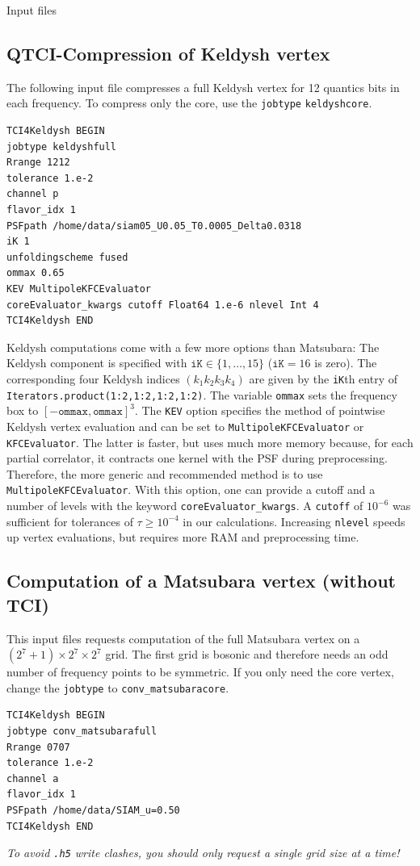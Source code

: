 \documentclass[12pt]{article}
\begin{document}
\begin{section}{Input files}
\subsection{QTCI-Compression of Keldysh vertex}
\label{subsec:KeldyshCompression}
The following input file compresses a full Keldysh vertex for 12 quantics bits in each frequency.
To compress only the core, use the \texttt{jobtype} \texttt{keldyshcore}.
\begin{verbatim}
TCI4Keldysh BEGIN
jobtype keldyshfull
Rrange 1212
tolerance 1.e-2
channel p
flavor_idx 1
PSFpath /home/data/siam05_U0.05_T0.0005_Delta0.0318
iK 1
unfoldingscheme fused
ommax 0.65
KEV MultipoleKFCEvaluator
coreEvaluator_kwargs cutoff Float64 1.e-6 nlevel Int 4
TCI4Keldysh END 
\end{verbatim}
Keldysh computations come with a few more options than Matsubara: The Keldysh component is
specified with $\texttt{iK}\in\{1,\ldots,15\}$ ($\texttt{iK}=16$ is zero). The corresponding four Keldysh indices
$(k_1k_2k_3k_4)$ are given by the \texttt{iK}th entry of \texttt{Iterators.product(1:2,1:2,1:2,1:2)}.
The variable \texttt{ommax} sets the frequency box to $[-\texttt{ommax},\texttt{ommax}]^3$.
The \texttt{KEV} option specifies the method of pointwise Keldysh vertex evaluation and can be set to
\texttt{MultipoleKFCEvaluator} or \texttt{KFCEvaluator}. The latter is faster, but uses much more memory because,
for each partial correlator, it contracts one kernel with the PSF during preprocessing.
Therefore, the more generic and recommended method is to use \texttt{MultipoleKFCEvaluator}.
With this option, one can provide a cutoff and a number of levels with the keyword \texttt{coreEvaluator\_kwargs}.
A \texttt{cutoff} of $10^{-6}$ was sufficient for tolerances of $\tau\geq10^{-4}$ in our calculations. Increasing \texttt{nlevel} speeds
up vertex evaluations, but requires more RAM and preprocessing time.
\subsection{Computation of a Matsubara vertex (without TCI)}
This input files requests computation of the full Matsubara vertex on a $(2^7+1)\times2^7\times2^7$ grid.
The first grid is bosonic and therefore needs an odd number of frequency points to be symmetric.
If you only need the core vertex, change the \texttt{jobtype} to \texttt{conv\_matsubaracore}.
\begin{verbatim}
TCI4Keldysh BEGIN
jobtype conv_matsubarafull
Rrange 0707
tolerance 1.e-2
channel a
flavor_idx 1
PSFpath /home/data/SIAM_u=0.50
TCI4Keldysh END  
\end{verbatim}
\textit{To avoid \texttt{.h5} write clashes, you should only request a single grid size at a time!}

\end{section}
\end{document}
